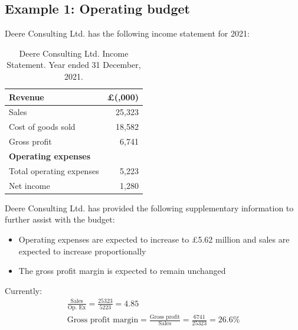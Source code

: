 \subsection{Example 1: Operating budget}
Deere Consulting Ltd. has the following income statement for 2021:
\begin{table}[H]
    \centering
    \begin{tabular}{@{}lr@{}}
        \toprule
        \textbf{Revenue}            & \textbf{\pounds (,000)} \\
        \midrule
        Sales                       & 25,323                  \\
        Cost of goods sold          & 18,582                  \\
        \midrule
        Gross profit                & 6,741                   \\
        \midrule
        \textbf{Operating expenses} &                         \\
        \midrule
        Total operating expenses    & 5,223                   \\
        \midrule
        Net income                  & 1,280                   \\
        \bottomrule
    \end{tabular}
    \caption{Deere Consulting Ltd. Income Statement. Year ended 31 December, 2021.}
\end{table}
Deere Consulting Ltd. has provided the following supplementary information to further assist with the budget:
\begin{itemize}
    \item Operating expenses are expected to increase to \pounds 5.62 million and sales are expected to increase proportionally
    \item The gross profit margin is expected to remain unchanged
\end{itemize}
Currently:
\begin{gather}
    \frac{\textrm{Sales}}{\textrm{Op. Ex}} = \frac{25323}{5223} = 4.85\\
    \textrm{Gross profit margin} = \frac{\textrm{Gross profit}}{\textrm{Sales}} = \frac{6741}{25323} = 26.6\%
\end{gather}
